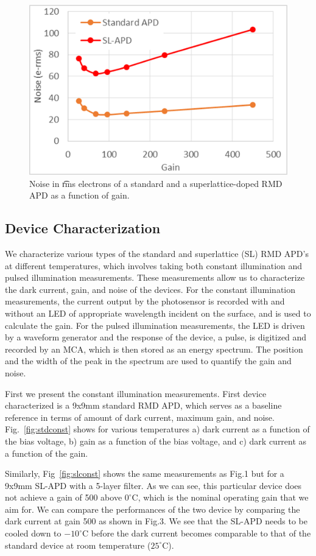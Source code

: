 \begin{figure}[h!]
\centering
\includegraphics[width=0.9\linewidth]{Figures/noise.png}
\caption{Noise in {\t rms} electrons of a standard and a superlattice-doped RMD APD as a function of gain.}
\label{fig:noise}
\end{figure}

\subsection{Device Characterization}
We characterize various types of the standard and superlattice (SL) RMD APD's at different temperatures, which involves taking both constant illumination and pulsed illumination measurements.  These measurements allow us to characterize the dark current, gain, and noise of the devices.  For the constant illumination measurements, the current output by the photosensor is recorded with and without an LED of appropriate wavelength incident on the surface, and is used to calculate the gain.  For the pulsed illumination measurements, the LED is driven by a waveform generator and the response of the device, a pulse, is digitized and recorded by an MCA, which is then stored as an energy spectrum.  The position and the width of the peak in the spectrum are used to quantify the gain and noise. 

First we present the constant illumination measurements.  First device characterized is a 9x9mm standard RMD APD, which serves as a baseline reference in terms of amount of dark current, maximum gain, and noise.  Fig.~\ref{fig:stdconst} shows for various temperatures a) dark current as a function of the bias voltage, b) gain as a function of the bias voltage, and c) dark current as a function of the gain.

Similarly, Fig~\ref{fig:slconst} shows the same measurements as Fig.1 but for a 9x9mm SL-APD with a 5-layer filter. As we can see, this particular device does not achieve a gain of 500 above $0^{\circ}$C, which is the nominal operating gain that we aim for.  We can compare the performances of the two device by comparing the dark current at gain 500 as shown in Fig.3.  We see that the SL-APD needs to be cooled down to $-10^{\circ}$C before the dark current becomes comparable to that of the standard device at room temperature ($25^{\circ}$C).

